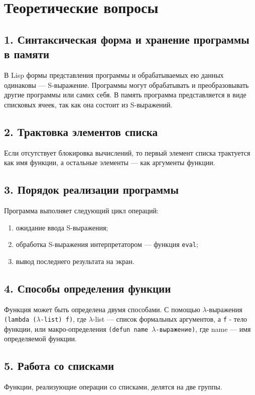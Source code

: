 \section*{Теоретические вопросы}

\subsection*{1. Синтаксическая форма и хранение программы в памяти}
В Lisp формы представления программы и обрабатываемых ею данных одинаковы
--- S-выражение. Программы могут обрабатывать и преобразовывать другие программы
или самих себя. В память программа представляется в виде списковых ячеек, так
как она состоит из S-выражений.

\subsection*{2. Трактовка элементов списка}
Если отсутствует блокировка вычислений, то первый элемент списка трактуется как
имя функции, а остальные элементы --- как аргументы функции.

\subsection*{3. Порядок реализации программы}
Программа выполняет следующий цикл операций:
\begin{enumerate}
    \item ожидание ввода S-выражения;
    \item обработка S-выражения интерпретатором --- функция \verb|eval|;
    \item вывод последнего результата на экран.
\end{enumerate}

\subsection*{4. Способы определения функции}
Функция может быть определена двумя способами. С помощью $\lambda$-выражения
\verb|(lambda (|$\lambda$\verb|-list) f)|, где $\lambda$-list --- список
формальных аргументов, а \verb|f| - тело функции, или макро-определения
\verb|(defun name |$\lambda$\verb|-выражение)|, где name --- имя определяемой
функции.

\subsection*{5. Работа со списками}
Функции, реализующие операции со списками, делятся на две группы.

